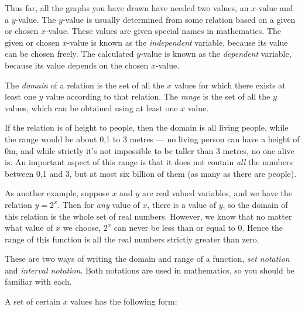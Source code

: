       \label{m39337*uid40}
            \nopagebreak
        \label{m39337*id235764}Thus far, all the graphs you have drawn have needed two values, an $x$-value and a $y$-value. The $y$-value is usually determined from some relation based on a given or chosen $x$-value. These values are given special names in mathematics. The given or chosen $x$-value is known as the \textsl{independent} variable, because its value can be chosen freely. The calculated $y$-value is known as the \textsl{dependent} variable, because its value depends on the chosen $x$-value.\par 
      \label{m39337*uid41}
            \nopagebreak
        \label{m39337*id235855}The \textsl{domain} of a relation is the set of all the $x$ values for which there exists at least one $y$ value according to that relation. The \textsl{range} is the set of all the $y$ values, which can be obtained using at least one $x$ value.\par 
        \label{m39337*id235908}If the relation is of height to people, then the domain is all living people, while the range would be about 0,1 to 3 metres --- no living person can have a height of 0m, and while strictly it's not impossible to be taller than 3 metres, no one alive is. An important aspect of this range is that it does not contain \textsl{all} the numbers between 0,1 and 3, but at most six billion of them (as many as there are people).\par 
        \label{m39337*id235939}As another example, suppose $x$ and $y$ are real valued variables, and we have the relation $y={2}^{x}$. Then for \textsl{any} value of $x$, there is a value of $y$, so the domain of this relation is the whole set of real numbers. However, we know that no matter what value of $x$ we choose, ${2}^{x}$ can never be less than or equal to 0. Hence the range of this function is all the real numbers strictly greater than zero.\par 
        \label{m39337*id236030}These are two ways of writing the domain and range of a function, \textsl{set notation} and \textsl{interval notation}. Both notations are used in mathematics, so you should be familiar with each.\par 
        \label{m39337*uid42}
            \nopagebreak
          \label{m39337*id236056}A set of certain $x$ values has the following form:\par 
          \label{m39337*uid43}\nopagebreak\noindent{}
            

